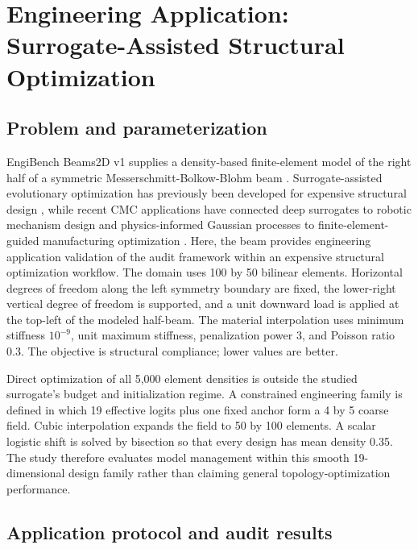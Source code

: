 \documentclass[cmc,article,submit,moreauthors,pdftex]{Definitions/tsp}
\begin{document}
\hypertarget{engineering-application-surrogate-assisted-structural-optimization}{%
\section{Engineering Application: Surrogate-Assisted Structural Optimization}\label{engineering-application-surrogate-assisted-structural-optimization}}

\hypertarget{problem-and-parameterization}{%
\subsection{Problem and parameterization}\label{problem-and-parameterization}}

EngiBench Beams2D v1 supplies a density-based finite-element model of the right half of a symmetric Messerschmitt-Bolkow-Blohm beam \cite{ref-23}. Surrogate-assisted evolutionary optimization has previously been developed for expensive structural design \cite{ref-18}, while recent CMC applications have connected deep surrogates to robotic mechanism design \cite{ref-28} and physics-informed Gaussian processes to finite-element-guided manufacturing optimization \cite{ref-29}. Here, the beam provides engineering application validation of the audit framework within an expensive structural optimization workflow. The domain uses 100 by 50 bilinear elements. Horizontal degrees of freedom along the left symmetry boundary are fixed, the lower-right vertical degree of freedom is supported, and a unit downward load is applied at the top-left of the modeled half-beam. The material interpolation uses minimum stiffness $10^{-9}$, unit maximum stiffness, penalization power 3, and Poisson ratio 0.3. The objective is structural compliance; lower values are better.

Direct optimization of all 5,000 element densities is outside the studied surrogate's budget and initialization regime. A constrained engineering family is defined in which 19 effective logits plus one fixed anchor form a 4 by 5 coarse field. Cubic interpolation expands the field to 50 by 100 elements. A scalar logistic shift is solved by bisection so that every design has mean density 0.35. The study therefore evaluates model management within this smooth 19-dimensional design family rather than claiming general topology-optimization performance.

\hypertarget{application-protocol-and-audit-results}{%
\subsection{Application protocol and audit results}\label{application-protocol-and-audit-results}}
\end{document}

